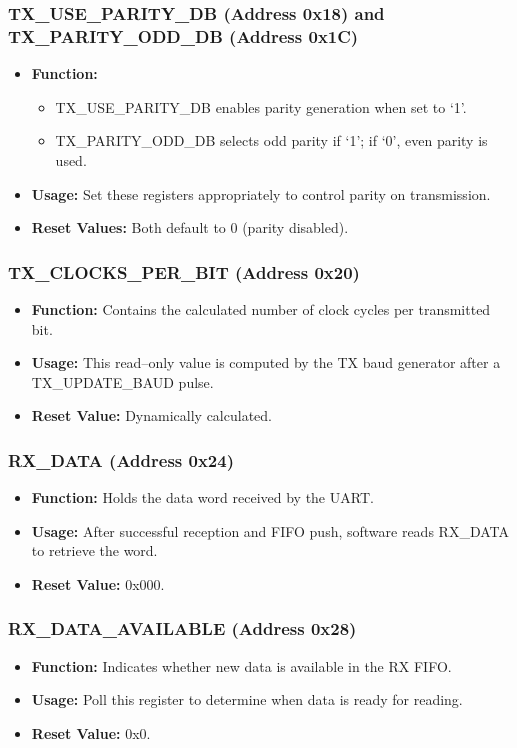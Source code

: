 \subsubsection{TX\_USE\_PARITY\_DB (Address 0x18) and TX\_PARITY\_ODD\_DB (Address 0x1C)}
\begin{itemize}[noitemsep]
    \item \textbf{Function:}
    \begin{itemize}
        \item TX\_USE\_PARITY\_DB enables parity generation when set to ‘1’.
        \item TX\_PARITY\_ODD\_DB selects odd parity if ‘1’; if ‘0’, even parity is used.
    \end{itemize}
    \item \textbf{Usage:} Set these registers appropriately to control parity on transmission.
    \item \textbf{Reset Values:} Both default to 0 (parity disabled).
\end{itemize}

\subsubsection{TX\_CLOCKS\_PER\_BIT (Address 0x20)}
\begin{itemize}[noitemsep]
    \item \textbf{Function:} Contains the calculated number of clock cycles per transmitted bit.
    \item \textbf{Usage:} This read–only value is computed by the TX baud generator after a TX\_UPDATE\_BAUD pulse.
    \item \textbf{Reset Value:} Dynamically calculated.
\end{itemize}

\subsubsection{RX\_DATA (Address 0x24)}
\begin{itemize}[noitemsep]
    \item \textbf{Function:} Holds the data word received by the UART.
    \item \textbf{Usage:} After successful reception and FIFO push, software reads RX\_DATA to retrieve the word.
    \item \textbf{Reset Value:} 0x000.
\end{itemize}

\subsubsection{RX\_DATA\_AVAILABLE (Address 0x28)}
\begin{itemize}[noitemsep]
    \item \textbf{Function:} Indicates whether new data is available in the RX FIFO.
    \item \textbf{Usage:} Poll this register to determine when data is ready for reading.
    \item \textbf{Reset Value:} 0x0.
\end{itemize}

